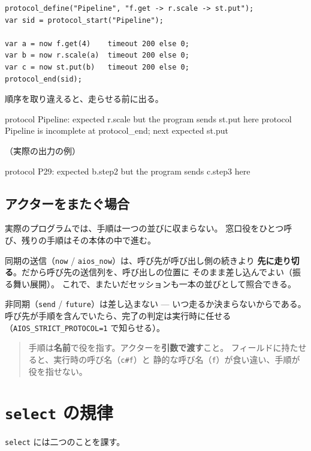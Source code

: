 \documentclass[11pt,a4paper]{ltjsarticle}
\begin{document}
\begin{lstlisting}
protocol_define("Pipeline", "f.get -> r.scale -> st.put");
var sid = protocol_start("Pipeline");

var a = now f.get(4)    timeout 200 else 0;
var b = now r.scale(a)  timeout 200 else 0;
var c = now st.put(b)   timeout 200 else 0;
protocol_end(sid);
\end{lstlisting}

順序を取り違えると、走らせる前に出る。

\begin{term}
protocol Pipeline: expected r.scale but the program sends st.put here
protocol Pipeline is incomplete at protocol_end; next expected st.put
\end{term}

（実際の出力の例）

\begin{term}
protocol P29: expected b.step2 but the program sends c.step3 here
\end{term}

\subsection{アクターをまたぐ場合}

実際のプログラムでは、手順は一つの並びに収まらない。
窓口役をひとつ呼び、残りの手順はその本体の中で進む。

同期の送信（\texttt{now} / \texttt{aios\_now}）は、呼び先が呼び出し側の続きより
\textbf{先に走り切る}。だから呼び先の送信列を、呼び出しの位置に
そのまま差し込んでよい（振る舞い展開）。
これで、またいだセッションも一本の並びとして照合できる。

非同期（\texttt{send} / \texttt{future}）は差し込まない ---
いつ走るか決まらないからである。
呼び先が手順を含んでいたら、完了の判定は実行時に任せる
（\texttt{AIOS\_STRICT\_PROTOCOL=1} で知らせる）。

\begin{quote}\small
手順は\textbf{名前}で役を指す。アクターを\textbf{引数で渡す}こと。
フィールドに持たせると、実行時の呼び名（\texttt{c\#f}）と
静的な呼び名（\texttt{f}）が食い違い、手順が役を指せない。
\end{quote}

\section{\texttt{select} の規律}
\label{sec:selectrule}

\texttt{select} には二つのことを課す。
\end{document}
